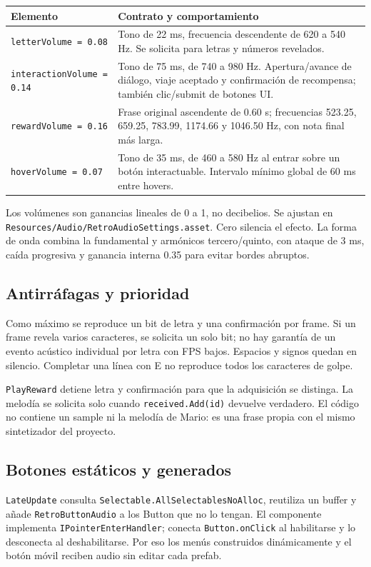 \documentclass[11pt,letterpaper,oneside]{article}
\makeatletter
\newcommand{\code}[1]{\nolinkurl{#1}}
\newenvironment{spec}{\begingroup\small\begin{longtable}{@{}>{\raggedright\arraybackslash}p{0.32\textwidth}>{\raggedright\arraybackslash}p{0.64\textwidth}@{}}\toprule\textbf{Elemento} & \textbf{Contrato y comportamiento} \\ \midrule\endhead}{\bottomrule\end{longtable}\endgroup}
\makeatother
\begin{document}
\begin{spec}
\code{letterVolume = 0.08} & Tono de 22 ms, frecuencia descendente de 620 a 540 Hz. Se solicita para letras y números revelados. \\
\code{interactionVolume = 0.14} & Tono de 75 ms, de 740 a 980 Hz. Apertura/avance de diálogo, viaje aceptado y confirmación de recompensa; también clic/submit de botones UI. \\
\code{rewardVolume = 0.16} & Frase original ascendente de 0.60 s; frecuencias 523.25, 659.25, 783.99, 1174.66 y 1046.50 Hz, con nota final más larga. \\
\code{hoverVolume = 0.07} & Tono de 35 ms, de 460 a 580 Hz al entrar sobre un botón interactuable. Intervalo mínimo global de 60 ms entre hovers. \\
\end{spec}
Los volúmenes son ganancias lineales de 0 a 1, no decibelios. Se ajustan en \code{Resources/Audio/RetroAudioSettings.asset}. Cero silencia el efecto. La forma de onda combina la fundamental y armónicos tercero/quinto, con ataque de 3 ms, caída progresiva y ganancia interna 0.35 para evitar bordes abruptos.

\subsection{Antirráfagas y prioridad}
Como máximo se reproduce un bit de letra y una confirmación por frame. Si un frame revela varios caracteres, se solicita un solo bit; no hay garantía de un evento acústico individual por letra con FPS bajos. Espacios y signos quedan en silencio. Completar una línea con E no reproduce todos los caracteres de golpe.

\code{PlayReward} detiene letra y confirmación para que la adquisición se distinga. La melodía se solicita solo cuando \code{received.Add(id)} devuelve verdadero. El código no contiene un sample ni la melodía de Mario: es una frase propia con el mismo sintetizador del proyecto.

\subsection{Botones estáticos y generados}
\code{LateUpdate} consulta \code{Selectable.AllSelectablesNoAlloc}, reutiliza un buffer y añade \code{RetroButtonAudio} a los Button que no lo tengan. El componente implementa \code{IPointerEnterHandler}; conecta \code{Button.onClick} al habilitarse y lo desconecta al deshabilitarse. Por eso los menús construidos dinámicamente y el botón móvil reciben audio sin editar cada prefab.
\end{document}
